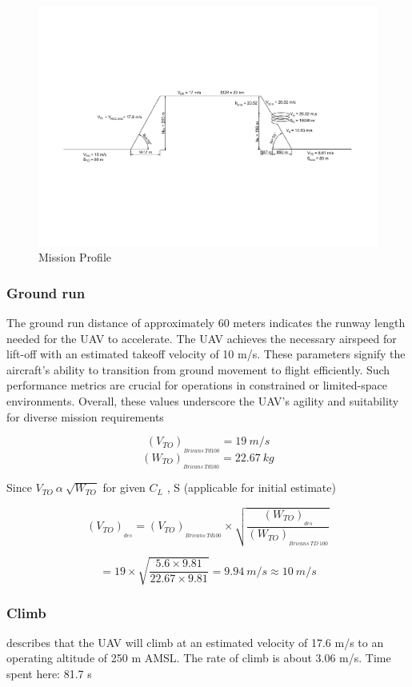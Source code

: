 \documentclass[12 pt]{article}
\begin{document}
\begin{figure}[h]
    \centering
    \includegraphics[width = \linewidth]{Drawing1-Model_final.pdf}
    \caption{Mission Profile}
    \label{Mission Profile}
\end{figure}


\subsubsection{Ground run}
The ground run distance of approximately 60 meters indicates the runway length needed for the UAV to accelerate. The UAV achieves the necessary airspeed for lift-off with an estimated takeoff velocity of 10 m/s. These parameters signify the aircraft's ability to transition from ground movement to flight efficiently. Such performance metrics are crucial for operations in constrained or limited-space environments. Overall, these values underscore the UAV's agility and suitability for diverse mission requirements \cite{EgglestonUnknownTitle2015}

$$ (V_{TO})_{_{Bricans \: Td100}} = 19 \: m/s$$
$$ (W_{TO})_{_{Bricans \: Td100}} = 22.67 \: kg$$

Since $ V_{TO} \: \alpha \: \sqrt{W_{TO}} $ for given $C_L$ , S (applicable for initial estimate)

$$ (V_{TO})_{_{des}} = (V_{TO})_{_{Bricans \: Td100}} \times \sqrt{\frac{(W_{TO})_{_{des}}}{(W_{TO})_{_{Bricans \: TD \: 100}}}} $$

$$ = 19 \times \sqrt{\frac{5.6 \times 9.81}{22.67 \times 9.81}} = 9.94 \: m/s \approx 10 \: m/s $$

\subsubsection{Climb} 
\cite{1000_questions}describes that the UAV will climb at an estimated velocity of 17.6 m/s to an operating altitude of 250 m AMSL. The rate of climb is about 3.06 m/s. Time spent here: 81.7 s
\end{document}
